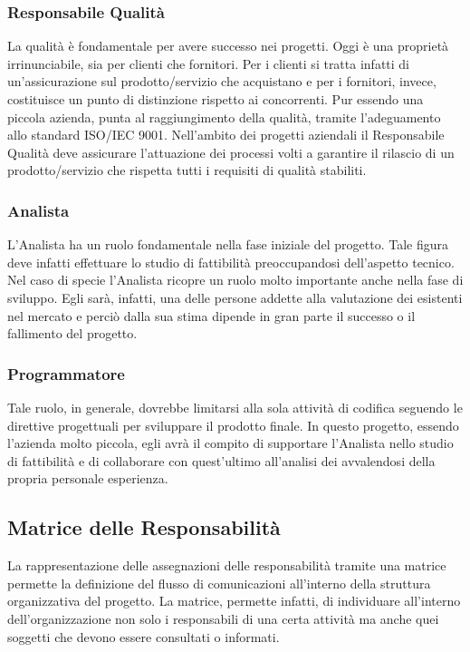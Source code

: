 \subsubsection{Responsabile Qualità}	
	La qualità è fondamentale per avere successo nei progetti. Oggi è una proprietà irrinunciabile, sia per clienti che fornitori. Per i clienti si tratta infatti di un'assicurazione sul prodotto/servizio che acquistano e per i fornitori, invece, costituisce  un punto di distinzione rispetto ai concorrenti.
Pur essendo una piccola azienda, \team punta al raggiungimento della qualità, tramite l'adeguamento allo standard ISO/IEC 9001.
Nell'ambito dei progetti aziendali il Responsabile Qualità deve assicurare l'attuazione dei processi volti a garantire il rilascio di un prodotto/servizio che rispetta tutti i requisiti di qualità stabiliti.
	 
\subsubsection{Analista}
	L'Analista ha un ruolo fondamentale nella fase iniziale del progetto. Tale figura deve infatti effettuare lo studio di fattibilità preoccupandosi dell'aspetto tecnico. Nel caso di specie l'Analista ricopre un ruolo molto importante anche nella fase di sviluppo. Egli sarà, infatti, una delle persone addette alla valutazione dei  esistenti nel mercato e perciò  dalla sua stima dipende in gran parte il successo o il fallimento del progetto.

\subsubsection{Programmatore}
	 Tale ruolo, in generale, dovrebbe limitarsi alla sola attività di codifica seguendo le direttive progettuali per sviluppare il prodotto finale. In questo progetto, essendo l'azienda molto piccola, egli avrà il compito di supportare l'Analista nello studio di fattibilità e di collaborare con quest'ultimo all'analisi dei  avvalendosi della propria personale esperienza.




\subsection{Matrice delle Responsabilità}
La rappresentazione delle assegnazioni delle responsabilità tramite una matrice permette la definizione del flusso di comunicazioni all'interno della struttura organizzativa del progetto. La matrice, permette infatti, di individuare all'interno dell'organizzazione non solo i responsabili di una certa attività ma anche quei soggetti che devono essere consultati o informati.

